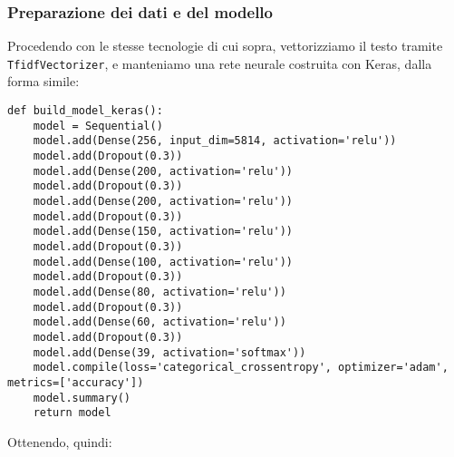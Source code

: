 \subsubsection{Preparazione dei dati e del modello}
Procedendo con le stesse tecnologie di cui sopra, vettorizziamo il testo tramite \texttt{TfidfVectorizer}, e manteniamo una rete neurale costruita con Keras, dalla forma simile:
\begin{verbatim}
def build_model_keras():
    model = Sequential()
    model.add(Dense(256, input_dim=5814, activation='relu'))
    model.add(Dropout(0.3))
    model.add(Dense(200, activation='relu'))
    model.add(Dropout(0.3))
    model.add(Dense(200, activation='relu'))
    model.add(Dropout(0.3))
    model.add(Dense(150, activation='relu'))
    model.add(Dropout(0.3))
    model.add(Dense(100, activation='relu'))
    model.add(Dropout(0.3))
    model.add(Dense(80, activation='relu'))
    model.add(Dropout(0.3))
    model.add(Dense(60, activation='relu'))
    model.add(Dropout(0.3))
    model.add(Dense(39, activation='softmax'))
    model.compile(loss='categorical_crossentropy', optimizer='adam', metrics=['accuracy'])
    model.summary()
    return model
\end{verbatim}
Ottenendo, quindi:
